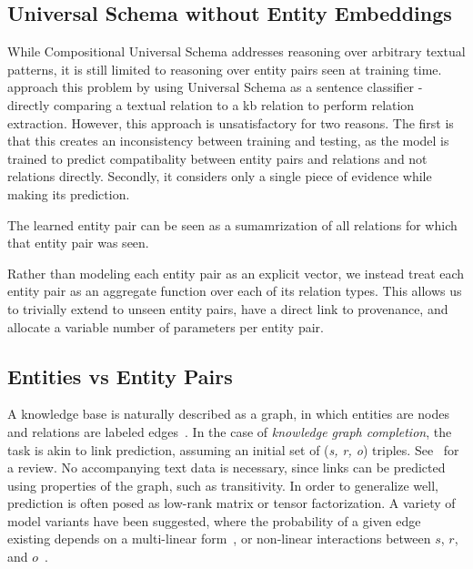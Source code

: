 \subsection {Universal Schema without Entity Embeddings}

While Compositional Universal Schema addresses reasoning over arbitrary textual patterns, it is still limited to reasoning over entity pairs seen at training time.
\citet{verga2015multilingual} approach this problem by using Universal Schema as a sentence classifier - directly comparing a textual relation to a kb relation to perform relation extraction.
However, this approach is unsatisfactory for two reasons.
The first is that this creates an inconsistency between training and testing, as the model is trained to predict compatibality between entity pairs and relations and not relations directly.
Secondly, it considers only a single piece of evidence while making its prediction.

The learned entity pair can be seen as a sumamrization of all relations for which that entity pair was seen.


Rather than modeling each entity pair as an explicit vector, we instead treat each entity pair as an aggregate function over each of its relation types.
This allows us to trivially extend to unseen entity pairs, have a direct link to provenance, and allocate a variable number of parameters per entity pair.


\subsection {Entities vs Entity Pairs}

A knowledge base is naturally described as a graph, in which entities are nodes and relations are labeled edges~\citep{yago,freebase}.
In the case of \emph{knowledge graph completion}, the task is akin to link prediction, assuming an initial set of (\emph{s, r, o}) triples.
See~\citet{nickel2015review} for a review.
No accompanying text data is necessary, since links can be predicted using properties of the graph, such as transitivity.
In order to generalize well, prediction is often posed as low-rank matrix or tensor factorization.
A variety of model variants have been suggested, where the probability of a given edge existing depends on a multi-linear form~\citep{rescal,DBLP:journals/corr/Garcia-DuranBUG15,bishan,transe,wang2014knowledge,lin2015learning}, or non-linear interactions between $s$, $r$, and $o$~\citep{socherkb}.

